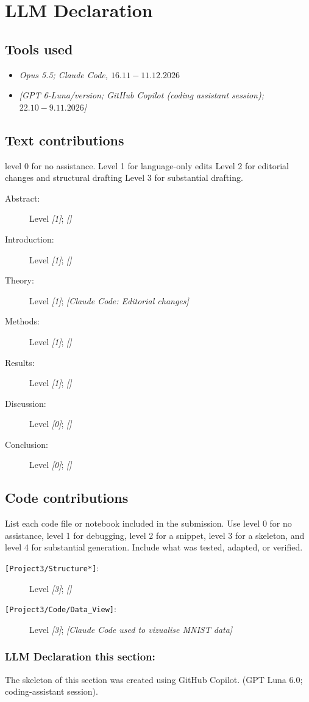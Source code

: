 \appendix
\section{LLM Declaration}

\subsection{Tools used}

\begin{itemize}
    \item \textit{Opus 5.5; Claude Code, $16.11-11.12.2026$}
    \item \textit{[GPT 6-Luna/version; GitHub Copilot (coding assistant session); $22.10-9.11.2026$]}
\end{itemize}
\subsection{Text contributions}

level 0 for no assistance.  
Level 1 for language-only edits
Level 2 for editorial changes and structural drafting
Level 3 for substantial drafting. 

\begin{description}
    \item[Abstract:] Level \textit{[1]}; \textit{[]}
    \item[Introduction:] Level \textit{[1]}; \textit{[]}
    \item[Theory:] Level \textit{[1]}; \textit{[Claude Code: Editorial changes]}
    \item[Methods:] Level \textit{[1]}; \textit{[]}
    \item[Results:] Level \textit{[1]}; \textit{[]}
    \item[Discussion:] Level \textit{[0]}; \textit{[]}
    \item[Conclusion:] Level \textit{[0]}; \textit{[]}
\end{description}


\subsection{Code contributions}

List each code file or notebook included in the submission. Use level 0 for no
assistance, level 1 for debugging, level 2 for a snippet, level 3 for a
skeleton, and level 4 for substantial generation. Include what was tested,
adapted, or verified.
\begin{description}
    \item[\texttt{[Project3/Structure*]}:] Level \textit{[3]};
    \textit{[]}
\end{description}
\begin{description}
    \item[\texttt{[Project3/Code/Data\_View]}:] Level \textit{[3]};
    \textit{[Claude Code used to vizualise MNIST data]}
\end{description}

\subsubsection{LLM Declaration this section:}
The skeleton of this section was created using GitHub Copilot.  
(GPT Luna 6.0; coding-assistant session). 
